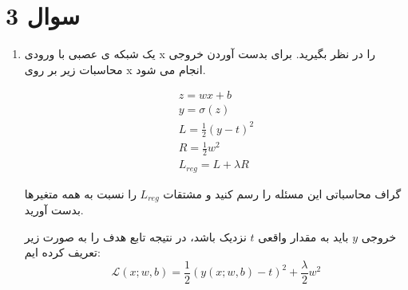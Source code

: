 \section{سوال 3}

\begin{enumerate}
	\item {
	      یک شبکه ی عصبی با ورودی x را در نظر بگیرید. برای بدست آوردن خروجی محاسبات زیر بر روی
	      x انجام می شود.

	      \begin{gather*}
		      z=wx+b\\
		      y=\sigma(z)\\
		      L=\frac{1}{2}(y-t)^2\\
		      R = \frac{1}{2}w^2\\
		      L_{reg}=L+\lambda R
	      \end{gather*}

	      گراف محاسباتی این مسئله را رسم کنید و مشتقات $L_{reg}$ را نسبت به همه متغیرها بدست آورید.

	      \begin{qsolve}[]
		      \begin{center}

			      خروجی $y$ باید به مقدار واقعی $t$ نزدیک باشد، در نتیجه تابع هدف را به صورت زیر تعریف کرده ایم:
			      \[
				      \mathcal{L}(x;w,b)=\frac{1}{2}(y(x;w,b)-t)^2+\frac{\lambda}{2}w^2
			      \]
		      \end{center}

		      \vspace*{-2em}


\end{qsolve}}
\end{enumerate}
